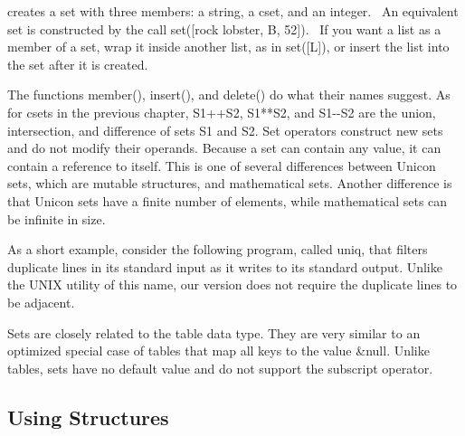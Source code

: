 
\noindent
creates a set with three members: a string, a cset, and an integer. \ An
equivalent set is constructed by the call
\textsf{set([{\textquotedbl}rock lobster{\textquotedbl},
{\textquotesingle}B{\textquotesingle}, 52])}. \ If you want a list as a
member of a set, wrap it inside another list, as in \textsf{set([L])},
or insert the list into the set after it is created.

The functions \textsf{member()},
\textsf{insert()}, and
\textsf{delete()} do what their names suggest. As
for csets in the previous chapter, \textsf{S1++S2}, \textsf{S1**S2},
and \textsf{S1-{}-S2} are the union,
intersection, and difference of sets \textsf{S1} and \textsf{S2}. Set
operators construct new sets and do not modify their operands. Because
a set can contain any value, it can contain a
reference to itself. This is one of several
differences between Unicon sets, which are mutable structures, and
mathematical sets. Another difference is that Unicon sets have a finite
number of elements, while mathematical sets can be infinite in size.

As a short example, consider the following program, called
\textsf{uniq}, that filters duplicate lines in its standard input as it
writes to its standard output. Unlike the UNIX utility of this name,
our version does not require the duplicate lines to be adjacent.


Sets are closely related to the table data type. They are very similar
to an optimized special case of tables that map all keys to the value
\textsf{\&null}. Unlike tables, sets have no default value and do not
support the subscript operator.

\subsection{Using Structures}

